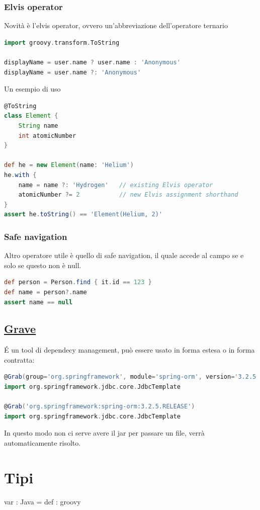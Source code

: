 \documentclass[11pt,a4paper]{book}
\begin{document}
\subsection{Elvis operator}
Novità è l'elvis operator, ovvero un'abbreviazione dell'operatore ternario
\begin{lstlisting}[language = groovy]
import groovy.transform.ToString

displayName = user.name ? user.name : 'Anonymous'   
displayName = user.name ?: 'Anonymous' 
\end{lstlisting}
Un esempio di uso
\begin{lstlisting}[language = groovy]
@ToString
class Element {
    String name
    int atomicNumber
}

def he = new Element(name: 'Helium')
he.with {
    name = name ?: 'Hydrogen'   // existing Elvis operator
    atomicNumber ?= 2           // new Elvis assignment shorthand
}
assert he.toString() == 'Element(Helium, 2)'
\end{lstlisting}

\subsection{Safe navigation}
Altro operatore utile è quello di safe navigation, il quale accede al campo se e solo se questo non è null.
\begin{lstlisting}[language = groovy]
def person = Person.find { it.id == 123 }    
def name = person?.name                      
assert name == null  
\end{lstlisting}

\section{\href{http://docs.groovy-lang.org/latest/html/documentation/grape.html}{Grave}}
É un tool di dependecy management, può essere usato in forma estesa o in forma contratta:
\begin{lstlisting}[language = groovy]
@Grab(group='org.springframework', module='spring-orm', version='3.2.5.RELEASE')
import org.springframework.jdbc.core.JdbcTemplate

@Grab('org.springframework:spring-orm:3.2.5.RELEASE')
import org.springframework.jdbc.core.JdbcTemplate
\end{lstlisting}

In questo modo non ci serve avere il jar per passare un file, verrà automaticamente risolto.

\chapter{Tipi}
var : Java = def : groovy
\end{document}
